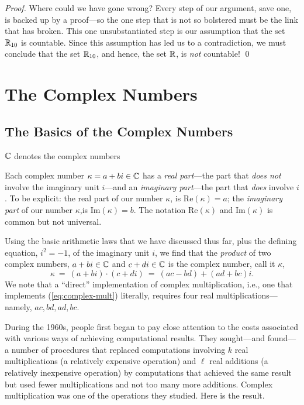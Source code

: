 \begin{proof}
Where could we have gone wrong?  Every step of our argument, save one,
is backed up by a proof---so the one step that is not so bolstered
must be the link that has broken.  This one unsubstantiated step is
our assumption that the set $\mathbb{R}_{10}$ is countable.  Since this
assumption has led us to a contradiction, we must conclude that the
set $\mathbb{R}_{10}$, and hence, the set $\mathbb{R}$, is {\em not} countable!
\qed
\end{proof}



\section{The Complex Numbers}
\label{sec:complexes}


\subsection{The Basics of the Complex Numbers}

$\mathbb{C}$ denotes the complex numbers

Each complex number $\kappa = a+bi \in \mathbb{C}$ has a {\it real part}---the
part that {\em does not} involve the imaginary unit $i$---and an {\it
  imaginary part}---the part that {\em does} involve $i$.  To be
explicit: the real part of our number $\kappa$, is Re$(\kappa) = a$;
the {\it imaginary part} of our number $\kappa$,is Im$(\kappa) = b$.
The notation Re$(\kappa)$ and Im$(\kappa)$ is common but not
universal.

Using the basic arithmetic laws that we have discussed thus far, plus
the defining equation, $i^2 = -1$, of the imaginary unit $i$, we find
that the {\em product} of two complex numbers, $a+bi \in \mathbb{C}$ and $c+di
\in \mathbb{C}$ is the complex number, call it $\kappa$,
\begin{equation}
\label{eq:complex-mult}
\kappa \ = \ (a+bi) \cdot (c+di) \ = \ (ac - bd) + (ad + bc)i.
\end{equation}
We note that a ``direct'' implementation of complex multiplication,
i.e., one that implements (\ref{eq:complex-mult}) literally, requires
four real multiplications---namely, $ac, bd, ad, bc$.

During the 1960s, people first began to pay close attention to the
costs associated with various ways of achieving computational results.
They sought---and found---a number of procedures that replaced
computations involving $k$ real multiplications (a relatively
expensive operation) and $\ell$ real additions (a relatively
inexpensive operation) by computations that achieved the same result
but used fewer multiplications and not too many more additions.
Complex multiplication was one of the operations they studied.  Here
is the result.

